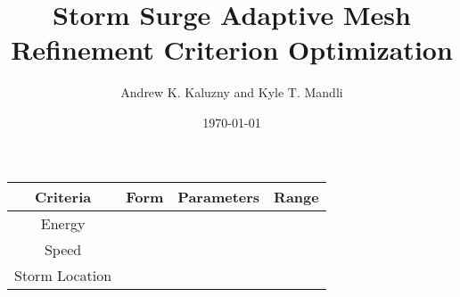 \documentclass[]{article}
\title{Storm Surge Adaptive Mesh Refinement Criterion Optimization}
\author{Andrew K. Kaluzny and Kyle T. Mandli}
\date{\today}
\begin{document}
\ifpdf
{}
\else
{}
\fi

\maketitle

\begin{center}
    \begin{tabular}{c|lll}
    \textbf{Criteria} & Form & \textbf{Parameters} & \textbf{Range} \\
    \hline
    Energy & & & \\
    Speed & & & \\
    Storm Location & & &
    \end{tabular}
\end{center}
\end{document}
